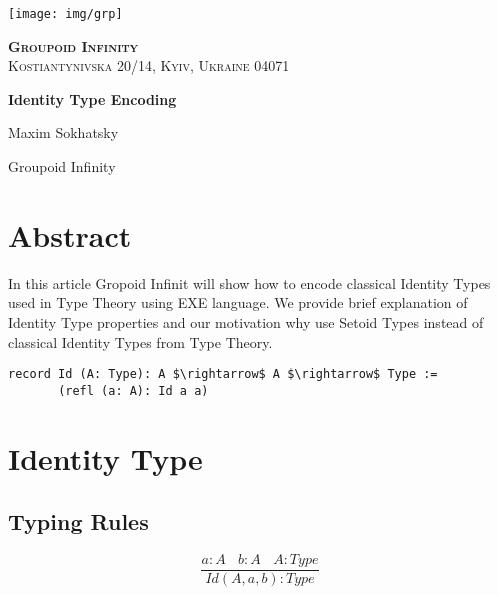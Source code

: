\documentclass[11pt,oneside]{article}
\begin{document}
\thispagestyle{empty}
\begin{center}

\begingroup
\parbox[t][][l]{0.30\textwidth}{ \texttt{[image: img/grp]} }
\parbox[t][][r]{0.60\textwidth}{ \flushright \textsc{{\Large {\bf {Groupoid Infinity}}}}\\
                                             \textsc{Kostiantynivska 20/14, Kyiv, Ukraine 04071}\\  }\endgroup

\vspace{6cm}   {\Large \bf Identity Type Encoding\\}\par
\vspace{0.3cm} {\Large Maxim Sokhatsky\par}
\vspace{6cm}   {\Large Groupoid Infinity\par}

\end{center}

\newpage
\vspace{2cm}
\tableofcontents
\newpage

\section{Abstract}

In this article Gropoid Infinit will show how to encode classical
Identity Types used in Type Theory using EXE language. We provide brief explanation
of Identity Type properties and our motivation why use Setoid Types instead
of classical Identity Types from Type Theory.

\begin{lstlisting}[mathescape=true]
record Id (A: Type): A $\rightarrow$ A $\rightarrow$ Type :=
       (refl (a: A): Id a a)
\end{lstlisting}

\section{Identity Type}

\subsection{Typing Rules}

\begin{equation}
\tag{$Id$-formation}
\dfrac
  {a:A\ \ \ \ b:A\ \ \ \ A:Type}
  {Id(A,a,b) : Type}
\end{equation}
\end{document}
